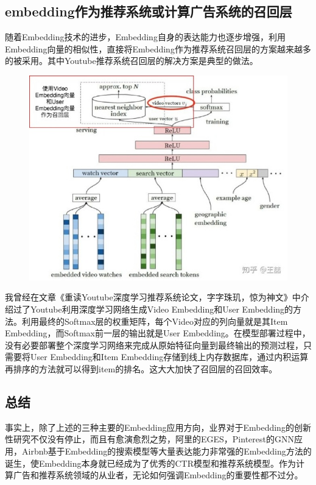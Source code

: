 \documentclass[12pt]{article}
\begin{document}
\subsection{embedding作为推荐系统或计算广告系统的召回层}
随着Embedding技术的进步，Embedding自身的表达能力也逐步增强，利用Embedding向量的相似性，直接将Embedding作为推荐系统召回层的方案越来越多的被采用。其中Youtube推荐系统召回层的解决方案是典型的做法。
\begin{figure}[H]
    \centering
    \includegraphics[width=1\textwidth]{fig/Embedding_In_Youtube.jpg}
\end{figure}

我曾经在文章《重读Youtube深度学习推荐系统论文，字字珠玑，惊为神文》中介绍过了Youtube利用深度学习网络生成Video Embedding和User Embedding的方法。利用最终的Softmax层的权重矩阵，每个Video对应的列向量就是其Item Embedding，而Softmax前一层的输出就是User Embedding。在模型部署过程中，没有必要部署整个深度学习网络来完成从原始特征向量到最终输出的预测过程，只需要将User Embedding和Item Embedding存储到线上内存数据库，通过内积运算再排序的方法就可以得到item的排名。这大大加快了召回层的召回效率。

\subsection{总结}
事实上，除了上述的三种主要的Embedding应用方向，业界对于Embedding的创新性研究不仅没有停止，而且有愈演愈烈之势，阿里的EGES，Pinterest的GNN应用，Airbnb基于Embedding的搜索模型等大量表达能力非常强的Embedding方法的诞生，使Embedding本身就已经成为了优秀的CTR模型和推荐系统模型。作为计算广告和推荐系统领域的从业者，无论如何强调Embedding的重要性都不过分。
\end{document}
